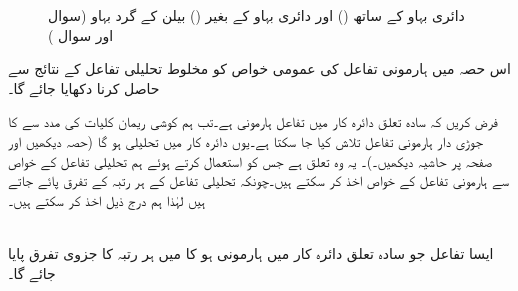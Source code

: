 \begin{figure}
\begin{subfigure}{0.5\textwidth}
\end{subfigure}
\caption{دائری بہاو کے ساتھ () اور دائری بہاو کے بغیر () بیلن کے گرد بہاو (سوال  اور سوال )}
\label{شکل_سوال_مخفی_قوہ_بیلن_کے_گرد}
\end{figure}


اس حصہ میں ہارمونی تفاعل کی عمومی خواص کو مخلوط تحلیلی تفاعل کے نتائج سے حاصل کرنا دکھایا جائے گا۔

فرض کریں کہ سادہ تعلق دائرہ کار  میں تفاعل  ہارمونی ہے۔تب ہم کوشی ریمان کلیات کی مدد سے  کا جوڑی دار ہارمونی تفاعل  تلاش کیا جا سکتا ہے۔یوں   دائرہ کار  میں تحلیلی ہو گا (حصہ  دیکھیں اور  صفحہ  پر حاشیہ دیکھیں۔)۔ یہ وہ تعلق ہے جس کو استعمال کرتے ہوئے ہم تحلیلی تفاعل کے خواص سے ہارمونی تفاعل کے خواص اخذ کر سکتے ہیں۔چونکہ تحلیلی تفاعل کے ہر رتبہ کے تفرق پائے جاتے ہیں لہٰذا ہم درج ذیل اخذ کر سکتے ہیں۔

\quad {}\\
 ایسا تفاعل  جو سادہ تعلق دائرہ کار  میں ہارمونی ہو کا   میں ہر رتبہ کا جزوی تفرق پایا جائے گا۔  

